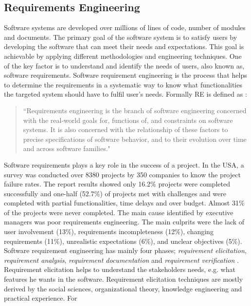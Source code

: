 \subsection{Requirements Engineering}

Software systems are developed over millions of lines of code, number of modules
and documents. The primary goal of the software system is to satisfy users by
developing the software that can meet their needs and expectations. This goal is
achievable by applying different methodologies and engineering techniques. One
of the key factor is to understand and identify the needs of users, also known
as, software requirements. Software requirement engineering is the process that
helps to determine the requirements in a systematic way to know what
functionalities the targeted system should have to fulfil user's needs. Formally
RE is defined as \cite{Zave:1997:CRE:267580.267581}:\\
\begin{quote}
``Requirements engineering is the branch of software engineering concerned with the real-world
goals for, functions of, and constraints on software systems. It is also concerned with the
relationship of these factors to precise specifications of software behavior, and to their evolution
over time and across software families."
\end{quote}
Software requirements plays a key role in the success of a project. In the USA, a
survey was conducted over 8380 projects by 350 companies to know the project
failure rates. The report \cite{StandishReport} results showed only 16.2\% projects were
completed successfully and one-half (52.7\%) of projects met with challenges and
were completed with partial functionalities, time delays and over budget. Almost
31\% of the projects were never completed. The main cause identified by
executive managers was poor requirements engineering. The main culprits were the lack of
user involvement (13\%), requirements incompleteness (12\%), changing requirements
(11\%), unrealistic expectations (6\%), and unclear objectives
(5\%). \\
Software requirement engineering has mainly four phases; \emph{requirement
elicitation}, \emph{requirement analysis}, \emph{requirement documentation} and
\emph{requirement verification} \cite {Kotonya:1998}. Requirement elicitation
\cite{Coughlan:2002, Zowghi2005} helps to understand the
stakeholders needs, e.g. what features he wants in the software.
Requirement elicitation techniques are mostly derived by the social sciences,
organizational theory, knowledge engineering and practical experience. For
